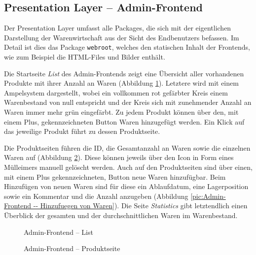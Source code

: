 \subsection{Presentation Layer -- Admin-Frontend}
\label{subsec: Presentation Layer}
Der Presentation Layer umfasst alle  Packages, die sich mit der eigentlichen Darstellung der Warenwirtschaft aus der Sicht des Endbenutzers befassen. Im Detail ist dies das Package \texttt{webroot}, welches den statischen Inhalt der Frontends, wie zum Beispiel die HTML-Files und Bilder enthält. \par
Die Startseite \textit{List} des Admin-Frontends zeigt eine Übersicht aller vorhandenen Produkte mit ihrer Anzahl an Waren (Abbildung \ref{pic:Admin-Frontend -- List}). Letztere wird mit einem Ampelsystem dargestellt, wobei ein vollkommen rot gefärbter Kreis einem Warenbestand von null entspricht und der Kreis sich mit zunehmender Anzahl an Waren immer mehr grün eingefärbt. Zu jedem Produkt können über den, mit einem  Plus, gekennzeichneten Button Waren hinzugefügt werden. Ein Klick auf das jeweilige Produkt führt zu dessen Produktseite. \par
Die Produktseiten führen die ID, die Gesamtanzahl an Waren sowie die einzelnen Waren auf (Abbildung \ref{pic:Admin-Frontend -- Produktseite}). Diese können jeweils über den Icon in Form eines Mülleimers manuell gelöscht werden. Auch auf den Produktseiten sind über einen, mit einem Plus gekennzeichneten, Button neue Waren hinzufügbar. Beim Hinzufügen von neuen Waren sind für diese ein Ablaufdatum, eine Lagerposition sowie ein Kommentar und die Anzahl anzugeben (Abbildung \ref{pic:Admin-Frontend -- Hinzufuegen von Waren}). Die Seite \textit{Statistics} gibt letztendlich einen Überblick der gesamten und der durchschnittlichen Waren im Warenbestand.

\begin{figure}[H]
	\centering
	\caption{Admin-Frontend -- List}
	\label{pic:Admin-Frontend -- List}
\end{figure}

\begin{figure}[H]
	\centering
	\caption{Admin-Frontend -- Produktseite}
	\label{pic:Admin-Frontend -- Produktseite}
\end{figure}


